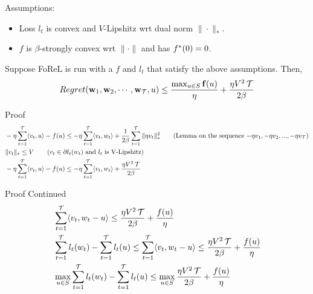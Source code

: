 \begin{frame}
  Assumptions:
  \begin{itemize}
  \item Loss $l_t$ is convex and $V$-Lipshitz wrt dual norm $\| \cdot \|_{*}$.
  \item $f$ is $\beta$-strongly convex wrt $\| \cdot \|$ and has ${f}^{*}(0)=0$.
  \end{itemize}

  \begin{theorem}
    Suppose FoReL is run with a $f$ and $l_t$ that satisfy the above assumptions. Then,
    \begin{align*}    
      Regret(\operatorname{\mathbf{w}}_1,\operatorname{\mathbf{w}}_2,\cdots,\operatorname{\mathbf{w}}_{\operatorname{\mathcal{T}}},u) \le \frac{\max_{u \in S} \operatorname{\mathbf{f}}(u)}{\eta} + \frac{\eta V^2\operatorname{\mathcal{T}}}{2\beta}
    \end{align*}  
  \end{theorem}
\end{frame}

\begin{frame}{Proof}
    \begin{align*}    
      & -\eta\sum_{t=1}^{\T} \dotprod{v_t}{u} -f(u) \le -\eta\sum_{t=1}^{\T} \dotprod{v_t}{w_t} +\frac{1}{2\beta} \sum_{t=1}^{\T} \|\eta v_t\|_{*}^2 \tag{Lemma on the sequence $-\eta v_1,-\eta v_2,...,-\eta v_{\T}$}\\
      & \|v_t\|_{*} \le V \tag{$v_t \in \partial l_t(w_t)$ and $l_t$ is V-Lipshitz} \\
      & -\eta\sum_{t=1}^{\T} \dotprod{v_t}{u} -f(u) \le -\eta\sum_{t=1}^{\T} \dotprod{v_t}{w_t} +\frac{\eta V^2\T}{2\beta} \\
    \end{align*}
\end{frame}

\begin{frame}{Proof Continued}
    \begin{align*}    
      & \sum_{t=1}^{\operatorname{\mathcal{T}}} \langle {v_t} , {w_t - u} \rangle \le \frac{\eta V^2\operatorname{\mathcal{T}}}{2\beta} + \frac{f(u)}{\eta} \\
      & \sum_{t=1}^{\operatorname{\mathcal{T}}} l_t(w_t) - \sum_{t=1}^{\operatorname{\mathcal{T}}} l_t(u) \le \sum_{t=1}^{\operatorname{\mathcal{T}}} \langle {v_t} , {w_t - u} \rangle \le \frac{\eta V^2\operatorname{\mathcal{T}}}{2\beta} + \frac{f(u)}{\eta} \\
      & \max_{u \in S} \sum_{t=1}^{\operatorname{\mathcal{T}}} l_t(w_t) - \sum_{t=1}^{\operatorname{\mathcal{T}}} l_t(u) \le \max_{u \in S} \frac{\eta V^2\operatorname{\mathcal{T}}}{2\beta} + \frac{f(u)}{\eta}
    \end{align*}  
\end{frame}


